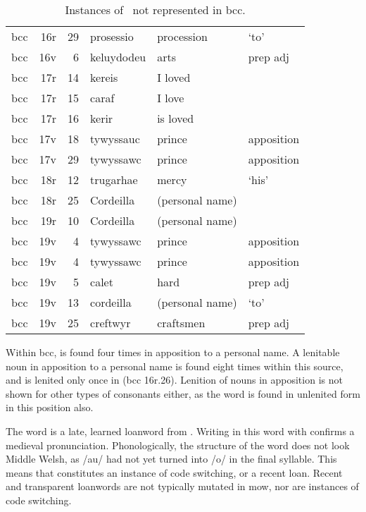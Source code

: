 \begin{table}[h]
  \centering
  \begin{tabular}{lddwql}
    \toprule
     &  &  &  &  &  \\
    \midrule
    \gls{bcc} & 16r & 29 & prosessio & procession &  ‘to' \\
    \gls{bcc} & 16v & 6 & keluydodeu & arts & prep adj \\
    \gls{bcc} & 17r & 14 & kereis & I loved &  \\
    \gls{bcc} & 17r & 15 & caraf & I love &  \\
    \gls{bcc} & 17r & 16 & kerir & is loved &  \\
    \gls{bcc} & 17v & 18 & tywyssauc & prince & apposition \\
    \gls{bcc} & 17v & 29 & tywyssawc & prince & apposition \\
    \gls{bcc} & 18r & 12 & trugarhae & mercy &  ‘his' \\
    \gls{bcc} & 18r & 25 & Cordeilla & (personal name) &  \\
    \gls{bcc} & 19r & 10 & Cordeilla & (personal name) &  \\
    \gls{bcc} & 19v & 4 & tywyssawc & prince & apposition \\
    \gls{bcc} & 19v & 4 & tywyssawc & prince & apposition \\
    \gls{bcc} & 19v & 5 & calet & hard & prep adj \\
    \gls{bcc} & 19v & 13 & cordeilla & (personal name) &  ‘to' \\
    \gls{bcc} & 19v & 25 & creftwyr & craftsmen & prep adj \\
    \bottomrule
  \end{tabular}%
  \caption{Instances of \lT\ not represented in \acrshort{bcc}.}
  \label{tab:ltnotrepbcc}
\end{table}

Within \gls{bcc},  is found four times in apposition to a personal name.
A lenitable noun in apposition to a personal name is found eight times within this source, and is lenited only once in  (\gls{bcc} 16r.26).
Lenition of nouns in apposition is not shown for other types of consonants either, as the word  is found in unlenited form in this position also.

The word  is a late, learned loanword from .
Writing  in this word with  confirms a medieval pronunciation.
Phonologically, the structure of the word does not look Middle Welsh, as /au/ had not yet turned into /o/ in the final syllable.
This means that  constitutes an instance of code switching, or a recent loan.
Recent and transparent loanwords are not typically mutated in \gls{mow}, nor are instances of code switching.

